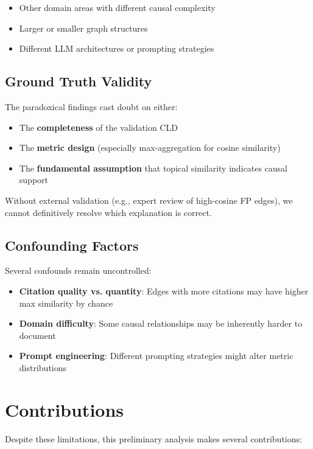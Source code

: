 \begin{itemize}
    \item Other domain areas with different causal complexity
    \item Larger or smaller graph structures
    \item Different LLM architectures or prompting strategies
\end{itemize}

\subsection{Ground Truth Validity}

The paradoxical findings cast doubt on either:

\begin{itemize}
    \item The \textbf{completeness} of the validation CLD
    \item The \textbf{metric design} (especially max-aggregation for cosine similarity)
    \item The \textbf{fundamental assumption} that topical similarity indicates causal support
\end{itemize}

Without external validation (e.g., expert review of high-cosine FP edges), we cannot definitively resolve which explanation is correct.

\subsection{Confounding Factors}

Several confounds remain uncontrolled:

\begin{itemize}
    \item \textbf{Citation quality vs. quantity}: Edges with more citations may have higher max similarity by chance
    \item \textbf{Domain difficulty}: Some causal relationships may be inherently harder to document
    \item \textbf{Prompt engineering}: Different prompting strategies might alter metric distributions
\end{itemize}

\section{Contributions}

Despite these limitations, this preliminary analysis makes several contributions:

